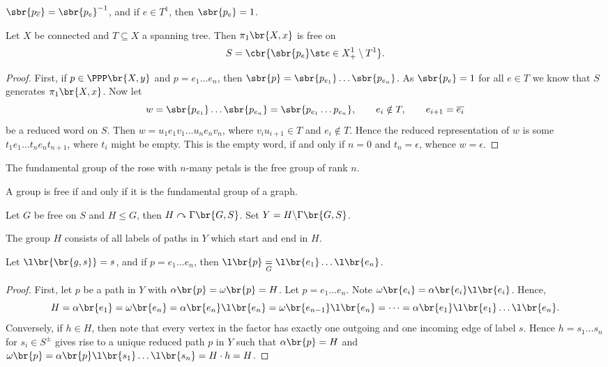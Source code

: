 \begin{note*}
$ \sbr{p_{\overline{e}}} = \sbr{p_e}^{-1} $, and if $ e \in T^1 $, then $ \sbr{p_e} = 1 $.
\end{note*}

\begin{theorem}
Let $ X $ be connected and $ T \subseteq X $ a spanning tree. Then $ \pi_1\br{X, x} $ is free on
$$ S = \cbr{\sbr{p_e} \st e \in X_+^1 \setminus T^1}. $$
\end{theorem}

\begin{proof}
First, if $ p \in \PPP\br{X, y} $ and $ p = e_1 \dots e_n $, then $ \sbr{p} = \sbr{p_{e_1}} \dots \sbr{p_{e_n}} $. As $ \sbr{p_e} = 1 $ for all $ e \in T $ we know that $ S $ generates $ \pi_1\br{X, x} $. Now let
$$ w = \sbr{p_{e_1}} \dots \sbr{p_{e_n}} = \sbr{p_{e_1} \dots p_{e_n}}, \qquad e_i \notin T, \qquad e_{i + 1} = \overline{e_i} $$
be a reduced word on $ S $. Then $ w = u_1e_1v_1 \dots u_ne_nv_n $, where $ v_iu_{i + 1} \in T $ and $ e_i \notin T $. Hence the reduced representation of $ w $ is some $ t_1e_1 \dots t_ne_nt_{n + 1} $, where $ t_i $ might be empty. This is the empty word, if and only if $ n = 0 $ and $ t_n = \epsilon $, whence $ w = \epsilon $.
\end{proof}

\begin{example}
The fundamental group of the rose with $ n $-many petals is the free group of rank $ n $.
\end{example}

\begin{remark}
A group is free if and only if it is the fundamental group of a graph.
\end{remark}

Let $ G $ be free on $ S $ and $ H \le G $, then $ H \curvearrowright \Gamma\br{G, S} $. Set $ Y = H \backslash \Gamma\br{G, S} $.

\begin{lemma}
\label{lem:1.7.9}
The group $ H $ consists of all labels of paths in $ Y $ which start and end in $ H $.
\end{lemma}

Let $ \l\br{\br{g, s}} = s $, and if $ p = e_1 \dots e_n $, then $ \l\br{p} \underset{G}{=} \l\br{e_1} \dots \l\br{e_n} $.

\begin{proof}
First, let $ p $ be a path in $ Y $ with $ \alpha\br{p} = \omega\br{p} = H $. Let $ p = e_1 \dots e_n $. Note $ \omega\br{e_i} = \alpha\br{e_i}\l\br{e_i} $. Hence,
$$ H = \alpha\br{e_1} = \omega\br{e_n} = \alpha\br{e_n}\l\br{e_n} = \omega\br{e_{n - 1}}\l\br{e_n} = \dots = \alpha\br{e_1}\l\br{e_1} \dots \l\br{e_n}. $$
Conversely, if $ h \in H $, then note that every vertex in the factor has exactly one outgoing and one incoming edge of label $ s $. Hence $ h = s_1 \dots s_n $ for $ s_i \in S^\pm $ gives rise to a unique reduced path $ p $ in $ Y $ such that $ \alpha\br{p} = H $ and $ \omega\br{p} = \alpha\br{p}\l\br{s_1} \dots \l\br{s_n} = H \cdot h = H $.
\end{proof}

